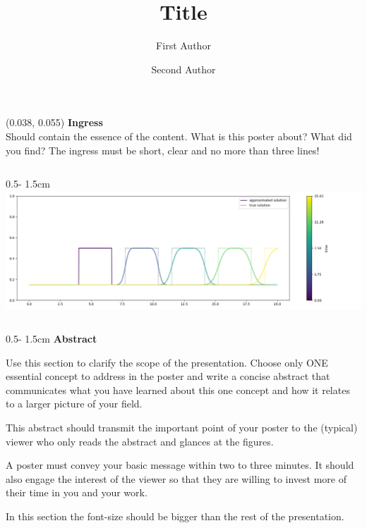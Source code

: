 \documentclass{uibposter}
\title{Title}
\author
{%
    First Author
    \and
    Second Author
}
\institute
{
    Department of mathematics -- University of Bergen
}
\begin{document}
\begin{textblock}{0.5}(0.038, 0.055)
    \color{white}
    \sffamily
    \textbf{Ingress}
    \\
Should contain the essence of the content. What is this poster about? What did you find? The ingress must be short, clear and no more than three lines!
\end{textblock}

\begin{frame}

\begin{columns}
\begin{column}{0.5\textwidth - 1.5cm}
    \includegraphics[width=\textwidth]{uibposter-images/test1.png}
    \vspace{0.5cm}

\begin{column}{0.5\textwidth - 1.5cm}
        \textbf{Abstract}
\vspace{0.5cm}

Use this section to clarify the scope of the presentation. Choose only ONE essential concept to address in the poster and write a concise abstract that communicates what you have learned about this one concept and how it relates to a larger picture of your field. 
\vspace{0.2cm}

This abstract should transmit the important point of your poster to the (typical) viewer who only reads the abstract and glances at the figures. 
\vspace{0.2cm}

A poster must convey your basic message within two to three minutes. It should also engage the interest of the viewer so that they are willing to invest more of their time in you and your work.
\vspace{0.2cm}

In this section the font-size should be bigger than the rest of the presentation. 
\vspace{0.2cm}


\end{column}
\end{column}
\end{columns}
\end{frame}
\end{document}
